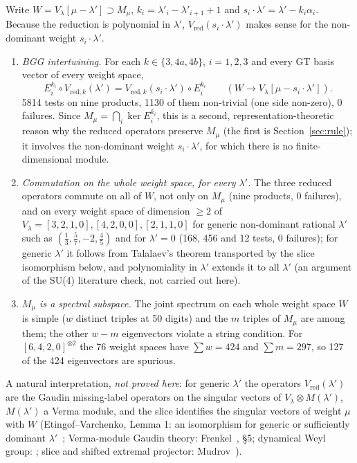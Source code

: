\documentclass[11pt]{article}
\begin{document}
Write $W=V_\lambda[\mu-\lambda']\supset M_\mu$, $k_i=\lambda'_i-\lambda'_{i+1}+1$ and $s_i\cdot\lambda'=\lambda'-k_i\alpha_i$.
Because the reduction is polynomial in $\lambda'$, $V_{\mathrm{red}}(s_i\cdot\lambda')$ makes sense for the non-dominant weight $s_i\cdot\lambda'$.
\begin{enumerate}
\item \emph{BGG intertwining.} For each $k\in\{3,4a,4b\}$, $i=1,2,3$ and every GT basis vector of every weight space,
\begin{equation}\label{eq:bgg}
E_i^{k_i}\circ V_{\mathrm{red},k}(\lambda')=V_{\mathrm{red},k}(s_i\cdot\lambda')\circ E_i^{k_i}\qquad(W\to V_\lambda[\mu-s_i\cdot\lambda']).
\end{equation}
5814 tests on nine products, 1130 of them non-trivial (one side non-zero), 0 failures.
Since $M_\mu=\bigcap_i\ker E_i^{k_i}$, this is a second, representation-theoretic reason why the reduced operators preserve $M_\mu$ (the first is Section~\ref{sec:rule}); it involves the non-dominant weight $s_i\cdot\lambda'$, for which there is no finite-dimensional module.
\item \emph{Commutation on the whole weight space, for every $\lambda'$.} The three reduced operators commute on all of $W$, not only on $M_\mu$ (nine products, 0 failures), and on every weight space of dimension $\ge2$ of $V_\lambda=[3,2,1,0],[4,2,0,0],[2,1,1,0]$ for generic non-dominant rational $\lambda'$ such as $(\tfrac13,\tfrac57,-2,\tfrac45)$ and for $\lambda'=0$ (168, 456 and 12 tests, 0 failures); for generic $\lambda'$ it follows from Talalaev's theorem transported by the slice isomorphism below, and polynomiality in $\lambda'$ extends it to all $\lambda'$ (an argument of the SU(4) literature check, not carried out here).
\item \emph{$M_\mu$ is a spectral subspace.} The joint spectrum on each whole weight space $W$ is simple ($w$ distinct triples at 50 digits) and the $m$ triples of $M_\mu$ are among them; the other $w-m$ eigenvectors violate a string condition.
For $[6,4,2,0]^{\otimes2}$ the 76 weight spaces have $\sum w=424$ and $\sum m=297$, so 127 of the 424 eigenvectors are spurious.
\end{enumerate}
A natural interpretation, \emph{not proved here}: for generic $\lambda'$ the operators $V_{\mathrm{red}}(\lambda')$ are the Gaudin missing-label operators on the singular vectors of $V_\lambda\otimes M(\lambda')$, $M(\lambda')$ a Verma module, and the slice identifies the singular vectors of weight $\mu$ with $W$ (Etingof--Varchenko, Lemma 1: an isomorphism for generic or sufficiently dominant $\lambda'$~\cite{ev}; Verma-module Gaudin theory: Frenkel~\cite{frenkel}, \S5; dynamical Weyl group: \cite{ev,stv}; slice and shifted extremal projector: Mudrov~\cite{mudrov}).
\end{document}
